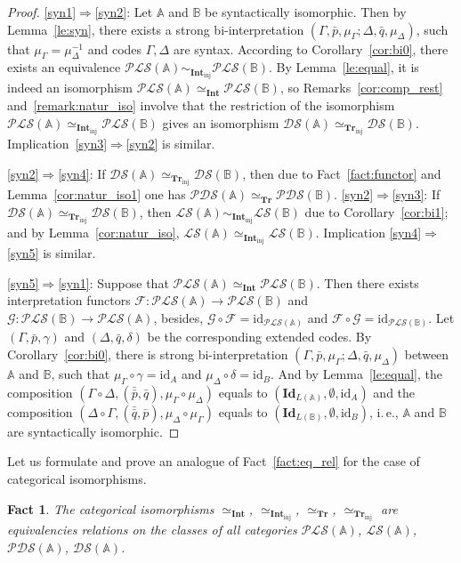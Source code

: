 \documentclass[12pt]{article}
\newtheorem{fact}{Fact}
\theoremstyle{definition}
\def\MA{{\mathbb{A}}}
\def\MB{{\mathbb{B}}}
\def\F{{\mathcal{F}}}
\def\G{{\mathcal{G}}}
\def\Int{{\mathbf{Int}}}
\def\Tr{{\mathbf{Tr}}}
\newcommand{\Inj}{\mathrm{inj}}
\def\PLS{{\mathcal{PLS}}}
\def\PDS{{\mathcal{PDS}}}
\def\DS{{\mathcal{DS}}}
\def\LS{{\mathcal{LS}}}
\def\id{{\mathrm{id}}}
\def\Id{{\mathbf{Id}}}
\begin{document}
\begin{proof}
\ref{syn1}$\Longrightarrow$\ref{syn2}: Let $\MA$ and $\MB$ be syntactically isomorphic. Then by Lemma~\ref{le:syn}, there exists a strong bi-interpretation  $(\Gamma,\bar p,\mu_\Gamma;\Delta,\bar q,\mu_\Delta)$, such that  $\mu_\Gamma=\mu_\Delta^{-1}$ and codes $\Gamma,\Delta$ are syntax. According to Corollary~\ref{cor:bi0}, there exists an equivalence $\PLS(\MA)\sim_{\Int_\Inj}\PLS(\MB)$. By Lemma~\ref{le:equal}, it is indeed an isomorphism $\PLS(\MA)\simeq_{\Int}\PLS(\MB)$, so Remarks~\ref{cor:comp_rest} and~\ref{remark:natur_iso} involve that the restriction of the isomorphism $\PLS(\MA)\simeq_{\Int_\Inj}\PLS(\MB)$  gives an isomorphism $\DS(\MA)\simeq_{\Tr_\Inj}\DS(\MB)$. Implication~\ref{syn3}$\Longrightarrow$\ref{syn2} is similar.

\ref{syn2}$\Longrightarrow$\ref{syn4}: If $\DS(\MA)\simeq_{\Tr_\Inj}\DS(\MB)$, then due to Fact~\ref{fact:functor} and Lemma~\ref{cor:natur_iso1} one has $\PDS(\MA)\simeq_{\Tr}\PDS(\MB)$. \ref{syn2}$\Longrightarrow$\ref{syn3}: If $\DS(\MA)\simeq_{\Tr_\Inj}\DS(\MB)$, then $\LS(\MA)\sim_{\Int_\Inj}\LS(\MB)$ due to Corollary~\ref{cor:bi1}; and by Lemma~\ref{cor:natur_iso},  $\LS(\MA)\simeq_{\Int_\Inj}\LS(\MB)$. Implication \ref{syn4}$\Longrightarrow$\ref{syn5} is similar.

\ref{syn5}$\Longrightarrow$\ref{syn1}: Suppose that $\PLS(\MA)\simeq_{\Int}\PLS(\MB)$. Then
there exists interpretation functors $\F\colon \PLS(\MA)\to\PLS(\MB)$ and $\G\colon \PLS(\MB)\to\PLS(\MA)$, besides, $\G\circ\F=\id_{\PLS(\MA)}$ and $\F\circ\G=\id_{\PLS(\MB)}$. Let $(\Gamma,\bar p,\gamma)$ and $(\Delta,\bar q, \delta)$ be the corresponding extended codes. By Corollary~\ref{cor:bi0}, there is strong bi-interpretation $(\Gamma,\bar p,\mu_\Gamma;\Delta,\bar q,\mu_\Delta)$ between $\MA$ and $\MB$, such that  $\mu_\Gamma\circ\gamma=\id_A$ and $\mu_\Delta\circ\delta=\id_B$. And by Lemma~\ref{le:equal}, the composition $(\Gamma\circ\Delta,(\bar{\bar p},\bar q),\mu_\Gamma\circ\mu_\Delta)$ equals to $(\Id_{L(\MA)},\emptyset,\id_A)$ and the composition $(\Delta\circ\Gamma,(\bar{\bar q},\bar p),\mu_\Delta\circ\mu_\Gamma)$ equals to $(\Id_{L(\MB)},\emptyset,\id_B)$, i.\,e., $\MA$ and $\MB$ are syntactically isomorphic.
\end{proof}

Let us formulate and prove an analogue of Fact~\ref{fact:eq_rel} for the case of categorical isomorphisms.

\begin{fact}\label{fact:eq_rel_syn}
The categorical isomorphisms $\simeq_\Int$, $\simeq_{\Int_\Inj}$, $\simeq_\Tr$, $\simeq_{\Tr_\Inj}$ are equivalencies relations on the classes of all categories $\PLS(\MA)$, $\LS(\MA)$, $\PDS(\MA)$, $\DS(\MA)$.
\end{fact}
\end{document}
